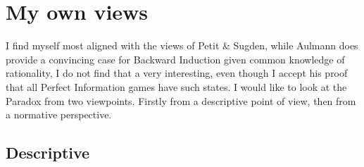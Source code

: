 \documentclass{article}
\begin{document}
\section{My own views}
I find myself most aligned with the views of Petit \& Sugden, while Aulmann does provide a convincing case for Backward Induction given common knowledge of rationality, I do not find that a very interesting, even though I accept his proof that all Perfect Information games have such states. I would like to look at the Paradox from two viewpoints. Firstly from a descriptive point of view, then from a normative perspective.

\subsection{Descriptive}
\end{document}
